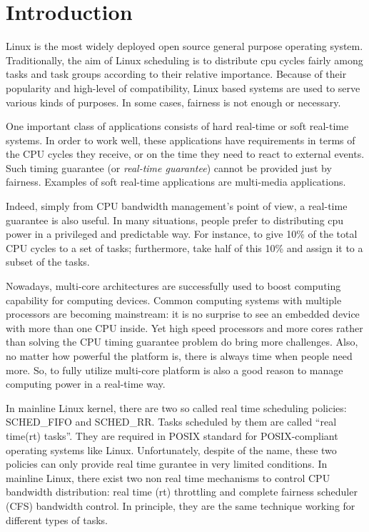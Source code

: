 \chapter{Introduction\label{chap:introduction}}

Linux is the most widely deployed open source general purpose
operating system. Traditionally, the aim of Linux scheduling is to
distribute cpu cycles fairly among tasks and task groups according to
their relative importance. Because of their popularity and high-level
of compatibility, Linux based systems are used to serve various kinds
of purposes. In some cases, fairness is not enough or necessary.

One important class of applications consists of hard real-time or soft
real-time systems. In order to work well, these applications have
requirements in terms of the CPU cycles they receive, or on the time
they need to react to external events. Such timing guarantee (or
\emph{real-time guarantee}) cannot be provided just by fairness.
Examples of soft real-time applications are multi-media applications.

Indeed, simply from CPU bandwidth management's point of view, a
real-time guarantee is also useful. 
%
In many situations, people prefer to distributing cpu power in a
privileged and predictable way. For instance, to give 10\% of the
total CPU cycles to a set of tasks; furthermore, take half of this
10\% and assign it to a subset of the tasks.

Nowadays, multi-core architectures are successfully used to boost
computing capability for computing devices. Common computing systems
with multiple processors are becoming mainstream: it is no surprise to
see an embedded device with more than one CPU inside.  Yet high speed
processors and more cores rather than solving the CPU timing guarantee
problem do bring more challenges. Also, no matter how powerful the
platform is, there is always time when people need more. So, to fully
utilize multi-core platform is also a good reason to manage computing
power in a real-time way.

In mainline Linux kernel, there are two so called real time scheduling 
policies: SCHED\_FIFO and SCHED\_RR. Tasks scheduled by them are called 
``real time(rt) tasks''. They are required in POSIX standard for 
POSIX-compliant operating systems like Linux. Unfortunately, despite of 
the name, these two policies can only provide real time gurantee in very 
limited conditions. In mainline Linux, there exist two non real time 
mechanisms to control CPU bandwidth distribution: real time (rt) throttling 
and complete fairness scheduler (CFS) bandwidth control. In principle, they 
are the same technique working for different types of tasks.

